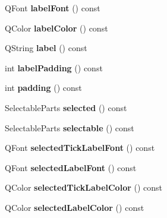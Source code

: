 \begin{DoxyCompactItemize}
\item 
\hypertarget{classQCPAxis_ae8029ae0b32e9d4d73dddcdd0a08c838}{Q\-Font {\bfseries label\-Font} () const }\label{classQCPAxis_ae8029ae0b32e9d4d73dddcdd0a08c838}

\item 
\hypertarget{classQCPAxis_a7854c2875e3b8d86b210d108bd87aeb9}{Q\-Color {\bfseries label\-Color} () const }\label{classQCPAxis_a7854c2875e3b8d86b210d108bd87aeb9}

\item 
\hypertarget{classQCPAxis_ab3486dca5a6e9e3ca0e32678272ba549}{Q\-String {\bfseries label} () const }\label{classQCPAxis_ab3486dca5a6e9e3ca0e32678272ba549}

\item 
\hypertarget{classQCPAxis_a59c9a0e362dec811491fc9a0709d2afa}{int {\bfseries label\-Padding} () const }\label{classQCPAxis_a59c9a0e362dec811491fc9a0709d2afa}

\item 
\hypertarget{classQCPAxis_abb85015a9467ec176e70698307ec833a}{int {\bfseries padding} () const }\label{classQCPAxis_abb85015a9467ec176e70698307ec833a}

\item 
\hypertarget{classQCPAxis_a534509949b91a6aa08e38cca48b62c9e}{Selectable\-Parts {\bfseries selected} () const }\label{classQCPAxis_a534509949b91a6aa08e38cca48b62c9e}

\item 
\hypertarget{classQCPAxis_a4e83e383fb5fbd9cf3759fab68f79aa6}{Selectable\-Parts {\bfseries selectable} () const }\label{classQCPAxis_a4e83e383fb5fbd9cf3759fab68f79aa6}

\item 
\hypertarget{classQCPAxis_ae245bb3dcd0ec71eee38437de6e719f7}{Q\-Font {\bfseries selected\-Tick\-Label\-Font} () const }\label{classQCPAxis_ae245bb3dcd0ec71eee38437de6e719f7}

\item 
\hypertarget{classQCPAxis_a078bbc88b33595a5308350c2889c96d4}{Q\-Font {\bfseries selected\-Label\-Font} () const }\label{classQCPAxis_a078bbc88b33595a5308350c2889c96d4}

\item 
\hypertarget{classQCPAxis_a5a3af4bd1a820bb7c6d4c85e1d8d452f}{Q\-Color {\bfseries selected\-Tick\-Label\-Color} () const }\label{classQCPAxis_a5a3af4bd1a820bb7c6d4c85e1d8d452f}

\item 
\hypertarget{classQCPAxis_a8cf8de6ac7f1ca617e05412f669ed229}{Q\-Color {\bfseries selected\-Label\-Color} () const }\label{classQCPAxis_a8cf8de6ac7f1ca617e05412f669ed229}


\end{DoxyCompactItemize}
